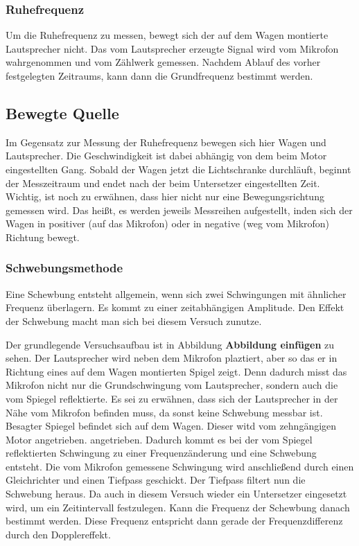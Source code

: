 \documentclass[parskip=half]{scrartcl} %
\begin{document}
\subsubsection{Ruhefrequenz}

Um die Ruhefrequenz zu messen, bewegt sich der auf dem Wagen montierte Lautsprecher nicht. 
Das vom Lautsprecher erzeugte Signal wird vom Mikrofon wahrgenommen und vom Zählwerk gemessen.
Nachdem Ablauf des vorher festgelegten Zeitraums, kann dann die Grundfrequenz bestimmt werden.

\subsection{Bewegte Quelle}

Im Gegensatz zur Messung der Ruhefrequenz bewegen sich hier Wagen und Lautsprecher.
Die Geschwindigkeit ist dabei abhängig von dem beim Motor eingestellten Gang.
Sobald der Wagen jetzt die Lichtschranke durchläuft, beginnt der Messzeitraum und
endet nach der beim Untersetzer eingestellten Zeit. Wichtig, ist noch zu erwähnen, dass hier 
nicht nur eine Bewegungsrichtung gemessen wird. Das heißt, es werden jeweils Messreihen 
aufgestellt, inden sich der Wagen in positiver (auf das Mikrofon) oder in negative (weg vom Mikrofon) Richtung
bewegt.

\subsubsection{Schwebungsmethode}

Eine Schewbung entsteht allgemein, wenn sich zwei Schwingungen mit ähnlicher Frequenz überlagern.
Es kommt zu einer zeitabhängigen Amplitude. Den Effekt der Schwebung macht man sich bei diesem Versuch
zunutze.

Der grundlegende Versuchsaufbau ist in Abbildung \textbf{Abbildung einfügen} zu sehen.
Der Lautsprecher wird neben dem Mikrofon plaztiert, aber so das er in Richtung eines
auf dem Wagen montierten Spigel zeigt. 
Denn dadurch misst das Mikrofon nicht nur die Grundschwingung vom Lautsprecher, sondern auch
die vom Spiegel reflektierte. 
Es sei zu erwähnen, dass sich der Lautsprecher in der Nähe vom Mikrofon befinden muss, da sonst keine Schwebung messbar ist.
Besagter Spiegel befindet sich auf dem Wagen. Dieser witd vom zehngängigen Motor angetrieben.
angetrieben. Dadurch kommt es bei der vom Spiegel reflektierten Schwingung zu einer Frequenzänderung
und eine Schwebung entsteht.
Die vom Mikrofon gemessene Schwingung wird anschließend durch einen Gleichrichter und einen Tiefpass geschickt.
Der Tiefpass filtert nun die Schwebung heraus. Da auch in diesem Versuch wieder ein Untersetzer eingesetzt wird, um
ein Zeitintervall festzulegen. Kann die Frequenz der Schewbung danach bestimmt werden.
Diese Frequenz entspricht dann gerade der Frequenzdifferenz durch den Dopplereffekt.
 

\printbibliography
\printindex
\end{document}
